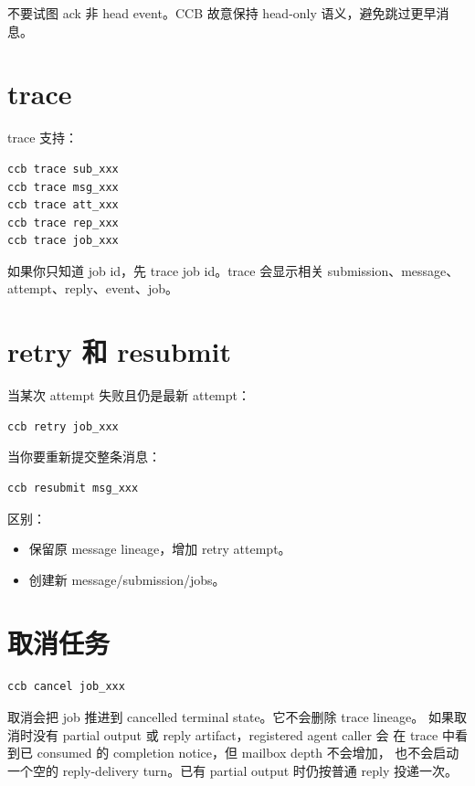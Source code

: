 不要试图 ack 非 head event。CCB 故意保持 head-only 语义，避免跳过更早消息。

\section{trace}

trace 支持：

\begin{lstlisting}
ccb trace sub_xxx
ccb trace msg_xxx
ccb trace att_xxx
ccb trace rep_xxx
ccb trace job_xxx
\end{lstlisting}

如果你只知道 job id，先 trace job id。trace 会显示相关 submission、message、attempt、reply、event、job。

\section{retry 和 resubmit}

当某次 attempt 失败且仍是最新 attempt：

\begin{lstlisting}
ccb retry job_xxx
\end{lstlisting}

当你要重新提交整条消息：

\begin{lstlisting}
ccb resubmit msg_xxx
\end{lstlisting}

区别：

\begin{itemize}
  \item {} 保留原 message lineage，增加 retry attempt。
  \item {} 创建新 message/submission/jobs。
\end{itemize}

\section{取消任务}

\begin{lstlisting}
ccb cancel job_xxx
\end{lstlisting}

取消会把 job 推进到 cancelled terminal state。它不会删除 trace lineage。
如果取消时没有 partial output 或 reply artifact，registered agent caller 会
在 trace 中看到已 consumed 的 completion notice，但 mailbox depth 不会增加，
也不会启动一个空的 reply-delivery turn。已有 partial output 时仍按普通 reply
投递一次。

